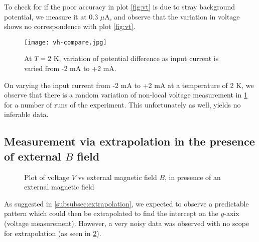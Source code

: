 To check for if the poor accuracy in plot \ref{fig:vt} is due to stray background potential, we measure it at 0.3 \( \mu \)A, and observe that the variation in voltage shows no correspondence with plot \ref{fig:vt}.

\begin{figure}[h!]
    \texttt{[image: vh-compare.jpg]}
    \caption{At \( T = 2 \) K, variation of potential difference as input current is varied from -2 mA to +2 mA.}
    \label{fig:vh-compare}
\end{figure}

On varying the input current from -2 mA to +2 mA at a temperature of 2 K, we observe that there is a random variation of non-local voltage measurement in \cref{fig:vh-compare} for a number of runs of the experiment. This unfortunately as well, yields no inferable data.

\clearpage

\subsection{Measurement via extrapolation in the presence of external \( B \) field}

\begin{figure}[!h]
    
    \caption{Plot of voltage \( V \) vs external magnetic field \( B \), in presence of an external magnetic field}
    \label{fig:b-extrapolation}
\end{figure}

As suggested in \cref{subsubsec:extrapolation}, we expected to observe a predictable pattern which could then be extrapolated to find the intercept on the \( y \)-axix (voltage measurement).
However, a very noisy data was observed with no scope for extrapolation (as seen in \cref{fig:b-extrapolation}).

